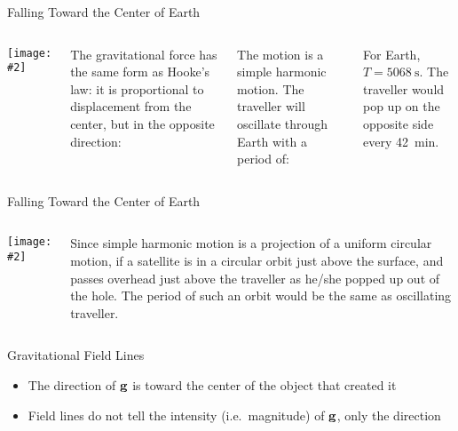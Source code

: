 \documentclass[12pt,compress,aspectratio=169]{beamer}
\newcommand{\pic}[2]{\texttt{[image: \#2]}}
\newcommand{\mb}[1]{\ensuremath\mathbf{#1}}
\newcommand{\eq}[2]{\vspace{#1}{\Large\begin{displaymath}#2\end{displaymath}}}
\begin{document}
\begin{frame}{Falling Toward the Center of Earth}
  \begin{columns}
    \pic{1}{eartholsat.png}

    The gravitational force has the same form as Hooke's law: it is
    proportional to displacement from the center, but in the opposite
    direction:

    \eq{-.2in}{
      F_g(r)=-kr
    }
    
    \vspace{-.15in}The motion is a simple harmonic motion. The traveller will
    oscillate through Earth with a period of:

    \eq{-.2in}{
      T=2\pi\sqrt{\frac{m}{k}}=2\pi\sqrt{\frac{r_\oplus}{g_0}}
    }

    For Earth, $T=\SI{5068}{\second}$. The traveller would pop up on the
    opposite side every \SI{42}{min}.
  \end{columns}
\end{frame}




\begin{frame}{Falling Toward the Center of Earth}
  \begin{columns}
    \pic{1}{eartholsat.png}

    Since simple harmonic motion is a projection of a uniform circular motion,
    if a satellite is in a circular orbit just above the surface, and passes
    overhead just above the traveller as he/she popped up out of the hole. The
    period of such an orbit would be the same as oscillating traveller.
  \end{columns}
\end{frame}



\begin{frame}{Gravitational Field Lines}
  \begin{center}
  \end{center}
  \begin{itemize}
  \item The direction of $\mb{g}$ is toward the center of the object that
    created it
  \item Field lines do not tell the intensity (i.e.\ magnitude) of $\mb{g}$,
    only the direction
  \end{itemize}
\end{frame}
\end{document}
